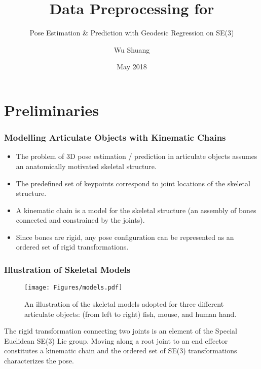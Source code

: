 \documentclass{beamer}
\title[Data Preprocessing]{Data Preprocessing for}
\subtitle{Pose Estimation \& Prediction with Geodesic Regression on SE(3)}
\author{Wu Shuang}
\date{May 2018}
\begin{document}
	
\frame{\titlepage}

\section{Preliminaries}

\begin{frame}
\frametitle{Modelling Articulate Objects with Kinematic Chains}
\begin{itemize}
	\justifying
	\item The problem of 3D pose estimation / prediction in articulate objects assumes an anatomically motivated skeletal structure.
	\item The predefined set of keypoints correspond to joint locations of the skeletal structure.
	\item A kinematic chain is a model for the skeletal structure (an assembly of bones connected and constrained by the joints).
	\item Since bones are rigid, any pose configuration can be represented as an ordered set of rigid transformations.
\end{itemize}
\end{frame}

\begin{frame}
\frametitle{Illustration of Skeletal Models}
\begin{figure}[H]
\centering
\texttt{[image: Figures/models.pdf]}
\caption
{An illustration of the skeletal models adopted for three different articulate objects: (from left to right) fish, mouse, and human hand. }
\label{fig:skeletalmodel}
\end{figure}
The rigid transformation connecting two joints is an element of the Special Euclidean SE(3) Lie group. Moving along a root joint to an end effector constitutes a kinematic chain and the ordered set of SE(3) transformations characterizes the pose.
\end{frame}
\end{document}
